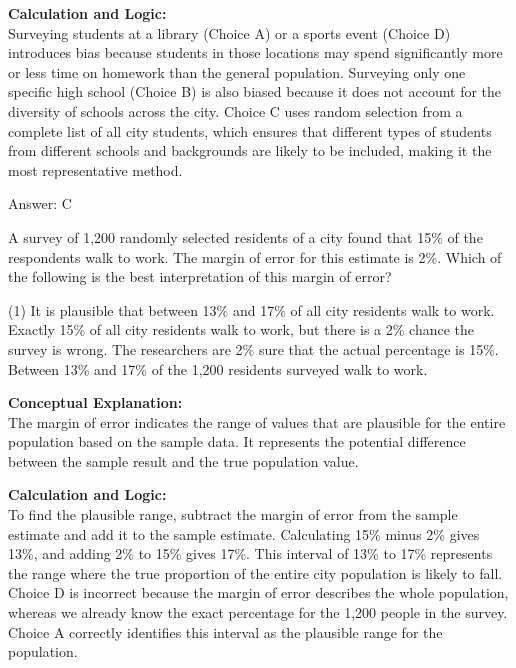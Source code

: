 \documentclass[11pt,paper=a4,answers]{exam}
\begin{document}
\begin{questions}
\begin{solution}
\textbf{Calculation and Logic:} \\
Surveying students at a library (Choice A) or a sports event (Choice D) introduces bias because students in those locations may spend significantly more or less time on homework than the general population. Surveying only one specific high school (Choice B) is also biased because it does not account for the diversity of schools across the city. Choice C uses random selection from a complete list of all city students, which ensures that different types of students from different schools and backgrounds are likely to be included, making it the most representative method.

\vspace{30pt}

Answer: \colorbox{yellow!100}{C}
\end{solution}

\vspace{60pt}

\question
A survey of 1,200 randomly selected residents of a city found that 15\% of the respondents walk to work. The margin of error for this estimate is 2\%. Which of the following is the best interpretation of this margin of error?
\begin{tasks}(1)
    \task It is plausible that between 13\% and 17\% of all city residents walk to work.
    \task Exactly 15\% of all city residents walk to work, but there is a 2\% chance the survey is wrong.
    \task The researchers are 2\% sure that the actual percentage is 15\%.
    \task Between 13\% and 17\% of the 1,200 residents surveyed walk to work.
\end{tasks}

\begin{solution}
\textbf{Conceptual Explanation:} \\
The margin of error indicates the range of values that are plausible for the entire population based on the sample data. It represents the potential difference between the sample result and the true population value.

\vspace{30pt}

\textbf{Calculation and Logic:} \\
To find the plausible range, subtract the margin of error from the sample estimate and add it to the sample estimate. Calculating 15\% minus 2\% gives 13\%, and adding 2\% to 15\% gives 17\%. This interval of 13\% to 17\% represents the range where the true proportion of the entire city population is likely to fall. Choice D is incorrect because the margin of error describes the whole population, whereas we already know the exact percentage for the 1,200 people in the survey. Choice A correctly identifies this interval as the plausible range for the population.


\end{solution}
\end{questions}
\end{document}
